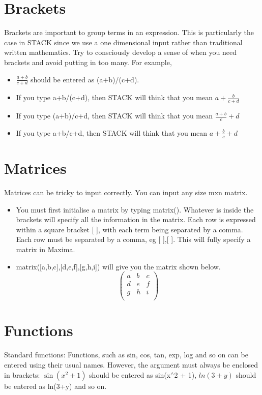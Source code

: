 \documentclass[a4paper]{article}
\begin{document}
\begin{multicols}{2}
\section*{Brackets}
Brackets are important to group terms in an expression. This is particularly the case in STACK since we use a one dimensional input rather than traditional written mathematics. Try to consciously develop a sense of when you need brackets and avoid putting in too many. For example,
\begin{itemize}
\item $\frac{a+b}{c+d}$ should be entered as (a+b)/(c+d).
\item If you type a+b/(c+d), then STACK will think that you mean $a + \frac{b}{c+d}$
\item If you type (a+b)/c+d, then STACK will think that you mean $\frac{a+b}{c} + d$
\item If you type a+b/c+d, then STACK will think that you mean $a + \frac{b}{c} + d$
\end{itemize}

\section*{Matrices}
Matrices can be tricky to input correctly. You can input any size mxn matrix.
\begin{itemize}
\item You must first initialise a matrix by typing matrix(). Whatever is inside the brackets will specify all the information in the matrix. Each row is expressed within a square bracket [ ], with each term being separated by a comma. Each row must be separated by a comma, eg [ ],[ ]. This will fully specify a matrix in Maxima.
\item matrix([a,b,c],[d,e,f],[g,h,i]) will give you the matrix shown below. 
\begin{displaymath}
\left( \begin{array}{ccc} a & b & c \\ d & e & f \\ g & h & i \\ \end{array} \right)
\end{displaymath}
\end{itemize}
\section*{Functions}
Standard functions: Functions, such as sin, cos, tan, exp, log and so on can be entered using their usual names. However, the argument must always be enclosed in brackets: $\sin{(x^2 + 1)}$ should be entered as sin(x$^{\wedge}$2 + 1), $ln{(3+y)}$ should be entered as ln(3+y) and so on.


\end{multicols}
\end{document}
